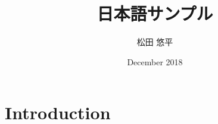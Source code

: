 \documentclass{article}
\title{日本語サンプル}
\author{松田 悠平}
\date{December 2018}
\begin{document}
\maketitle

\section{Introduction}
\end{document}
